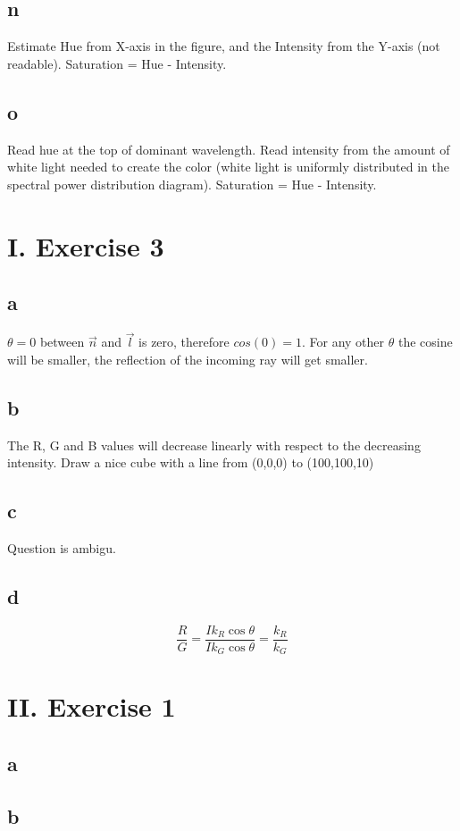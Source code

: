 \documentclass[a4paper,11pt]{article}
\begin{document}
	\subsection*{n}
		Estimate Hue from X-axis in the figure, and the Intensity from the Y-axis (not readable). Saturation = Hue - Intensity.	
	\subsection*{o}
		Read hue at the top of dominant wavelength. Read intensity from the amount of white light needed to create the color (white light is uniformly distributed in the spectral power distribution diagram). Saturation = Hue - Intensity.	
		
	
	\section*{I. Exercise 3}	
	\subsection*{a}
		$\theta=0$ between $\overrightarrow{n}$ and $\overrightarrow{l}$ is zero, therefore $cos(0)=1$. For any other $\theta$ the cosine will be smaller, the reflection of the incoming ray will get smaller.
	\subsection*{b}
		The R, G and B values will decrease linearly with respect to the decreasing intensity. Draw a nice cube with a line from (0,0,0) to (100,100,10)
		
	\subsection*{c}
		Question is ambigu.
		
	\subsection*{d}
	\[\frac{R}{G} = \frac{Ik_R \cos{\theta}}{Ik_G \cos{\theta}}=\frac{k_R}{k_G} \]		
	
	
	\section*{II. Exercise 1}
	\subsection*{a}
	\subsection*{b}
\end{document}
